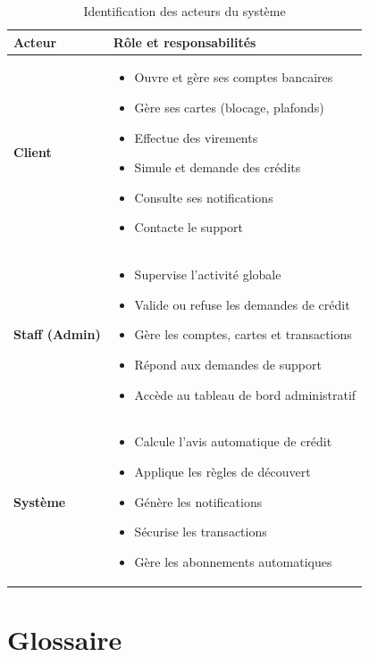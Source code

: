 \documentclass[12pt,a4paper]{report}
\begin{document}
\begin{table}[H]
\centering
\begin{tabular}{|p{3cm}|p{11cm}|}
\hline
\rowcolor{banquiseblue!30}
\textbf{Acteur} & \textbf{Rôle et responsabilités} \\
\hline
\textbf{Client} & 
\begin{itemize}[leftmargin=0.5cm]
    \item Ouvre et gère ses comptes bancaires
    \item Gère ses cartes (blocage, plafonds)
    \item Effectue des virements
    \item Simule et demande des crédits
    \item Consulte ses notifications
    \item Contacte le support
\end{itemize} \\
\hline
\textbf{Staff (Admin)} & 
\begin{itemize}[leftmargin=0.5cm]
    \item Supervise l'activité globale
    \item Valide ou refuse les demandes de crédit
    \item Gère les comptes, cartes et transactions
    \item Répond aux demandes de support
    \item Accède au tableau de bord administratif
\end{itemize} \\
\hline
\textbf{Système} & 
\begin{itemize}[leftmargin=0.5cm]
    \item Calcule l'avis automatique de crédit
    \item Applique les règles de découvert
    \item Génère les notifications
    \item Sécurise les transactions
    \item Gère les abonnements automatiques
\end{itemize} \\
\hline
\end{tabular}
\caption{Identification des acteurs du système}
\end{table}

\section{Glossaire}
\end{document}
